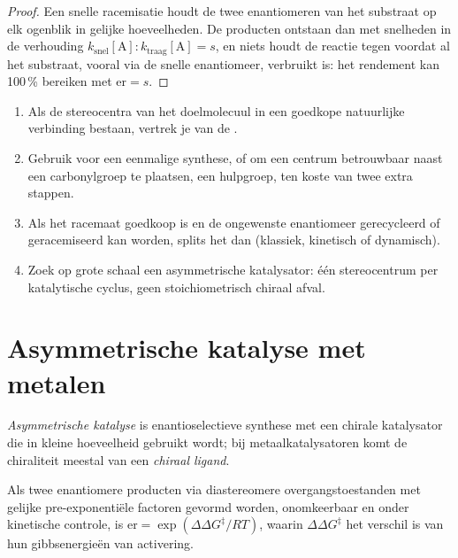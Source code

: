 \begin{proof}
Een snelle racemisatie houdt de twee enantiomeren van het substraat op
elk ogenblik in gelijke hoeveelheden. De producten ontstaan dan met
snelheden in de verhouding $k_{\mathrm{snel}}[\mathrm A] : k_{\mathrm{traag}}[\mathrm A] = s$, en niets
houdt de reactie tegen voordat al het substraat, vooral via de snelle
enantiomeer, verbruikt is: het rendement kan 100\,\% bereiken met $\mathrm{er} = s$.
\end{proof}

\begin{method}\label{met:b3:asymmetric-synthesis:strategy}
\begin{enumerate}
  \item Als de stereocentra van het doelmolecuul in een goedkope
        natuurlijke verbinding bestaan, vertrek je van de .
  \item Gebruik voor een eenmalige synthese, of om een centrum
        betrouwbaar naast een carbonylgroep te plaatsen, een hulpgroep,
        ten koste van twee extra stappen.
  \item Als het racemaat goedkoop is en de ongewenste enantiomeer
        gerecycleerd of geracemiseerd kan worden, splits het dan
        (klassiek, kinetisch of dynamisch).
  \item Zoek op grote schaal een asymmetrische katalysator: één
        stereocentrum per katalytische cyclus, geen stoichiometrisch
        chiraal afval.
\end{enumerate}
\end{method}

\section{Asymmetrische katalyse met metalen}

\begin{definition}\label{def:b3:asymmetric-synthesis:asymmetric-catalysis}
\emph{Asymmetrische katalyse} is
enantioselectieve synthese met een chirale katalysator die in kleine
hoeveelheid gebruikt wordt; bij metaalkatalysatoren komt de chiraliteit
meestal van een \emph{chiraal ligand}.
\end{definition}

\begin{theorem}\label{thm:b3:asymmetric-synthesis:er-ddg}
Als twee enantiomere producten via diastereomere overgangstoestanden met
gelijke pre-exponentiële factoren gevormd worden, onomkeerbaar en onder
kinetische controle, is
$\mathrm{er} = \exp(\Delta\Delta G^\ddagger/RT)$, waarin $\Delta\Delta G^\ddagger$ het verschil is van hun gibbsenergieën van
activering.
\end{theorem}

